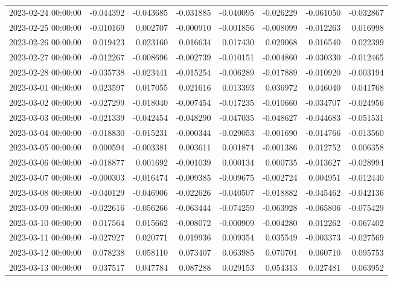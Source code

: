 \begin{tabular}{lrrrrrrr}
2023-02-24 00:00:00 & -0.044392 & -0.043685 & -0.031885 & -0.040095 & -0.026229 & -0.061050 & -0.032867 \\
2023-02-25 00:00:00 & -0.010169 & 0.002707 & -0.000910 & -0.001856 & -0.008099 & -0.012263 & 0.016998 \\
2023-02-26 00:00:00 & 0.019423 & 0.023160 & 0.016634 & 0.017430 & 0.029068 & 0.016540 & 0.022399 \\
2023-02-27 00:00:00 & -0.012267 & -0.008696 & -0.002739 & -0.010151 & -0.004860 & -0.030330 & -0.012465 \\
2023-02-28 00:00:00 & -0.035738 & -0.023441 & -0.015254 & -0.006289 & -0.017889 & -0.010920 & -0.003194 \\
2023-03-01 00:00:00 & 0.023597 & 0.017055 & 0.021616 & 0.013393 & 0.036972 & 0.046040 & 0.041768 \\
2023-03-02 00:00:00 & -0.027299 & -0.018040 & -0.007454 & -0.017235 & -0.010660 & -0.034707 & -0.024956 \\
2023-03-03 00:00:00 & -0.021339 & -0.042454 & -0.048290 & -0.047035 & -0.048627 & -0.044683 & -0.051531 \\
2023-03-04 00:00:00 & -0.018830 & -0.015231 & -0.000344 & -0.029053 & -0.001690 & -0.014766 & -0.013560 \\
2023-03-05 00:00:00 & 0.000594 & -0.003381 & 0.003611 & 0.001874 & -0.001386 & 0.012752 & 0.006358 \\
2023-03-06 00:00:00 & -0.018877 & 0.001692 & -0.001039 & 0.000134 & 0.000735 & -0.013627 & -0.028994 \\
2023-03-07 00:00:00 & -0.000303 & -0.016474 & -0.009385 & -0.009675 & -0.002724 & 0.004951 & -0.012440 \\
2023-03-08 00:00:00 & -0.040129 & -0.046906 & -0.022626 & -0.040507 & -0.018882 & -0.045462 & -0.042136 \\
2023-03-09 00:00:00 & -0.022616 & -0.056266 & -0.063444 & -0.074259 & -0.063928 & -0.065806 & -0.075429 \\
2023-03-10 00:00:00 & 0.017564 & 0.015662 & -0.008072 & -0.000909 & -0.004280 & 0.012262 & -0.067402 \\
2023-03-11 00:00:00 & -0.027927 & 0.020771 & 0.019936 & 0.009354 & 0.035549 & -0.003373 & -0.027569 \\
2023-03-12 00:00:00 & 0.078238 & 0.058110 & 0.073407 & 0.063985 & 0.070701 & 0.060710 & 0.095753 \\
2023-03-13 00:00:00 & 0.037517 & 0.047784 & 0.087288 & 0.029153 & 0.054313 & 0.027481 & 0.063952 \\

\end{tabular}
